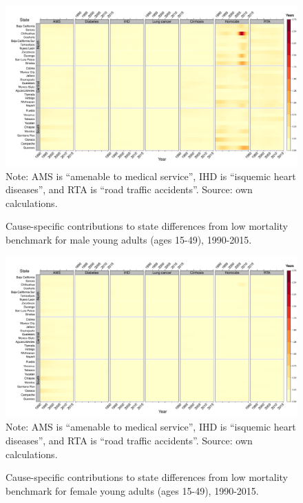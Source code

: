 \documentclass[11.5pt]{article}
\begin{document}
{\begin{figure}
\centering
\caption{Cause-specific contributions to state differences from low mortality benchmark for male young adults (ages 15-49), 1990-2015.}
\label{fig:e15_39_males}
\includegraphics[scale=.3]{YoungAdult_Male_heatmap.pdf}
Note: AMS is ``amenable to medical service'', IHD is ``isquemic heart diseases'', and RTA is ``road traffic accidents''. Source: own calculations.
\end{figure}

\begin{figure}
\centering
\caption{Cause-specific contributions to state differences from low mortality benchmark for female young adults (ages 15-49), 1990-2015.}
\label{fig:e15_39_females}
\includegraphics[scale=.3]{YoungAdult_Female_heatmap.pdf}
Note: AMS is ``amenable to medical service'', IHD is ``isquemic heart diseases'', and RTA is ``road traffic accidents''. Source: own calculations.
\end{figure}



}
\end{document}
